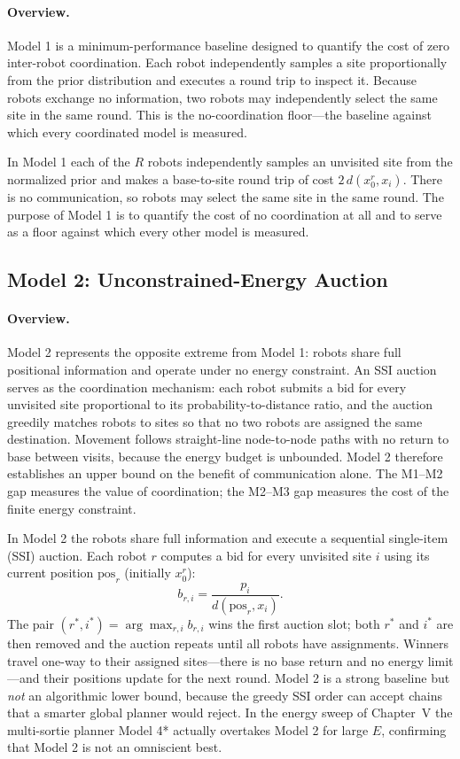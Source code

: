 \begin{doublespacing}
\paragraph{Overview.} Model 1 is a minimum-performance baseline designed
to quantify the cost of zero inter-robot coordination.
Each robot independently samples a site proportionally from the
prior distribution and executes a round trip to inspect it.
Because robots exchange no information, two robots may independently
select the same site in the same round.
This is the no-coordination floor---the baseline against which every
coordinated model is measured.

In Model 1 each of the $R$ robots independently samples an unvisited
site from the normalized prior and makes a base-to-site round trip of
cost $2\,d(x_0^r, x_i)$. There is no communication, so robots may
select the same site in the same round. The purpose of Model 1 is to
quantify the cost of no coordination at all and to serve as a floor
against which every other model is measured.

\subsection{Model 2: Unconstrained-Energy Auction}

\paragraph{Overview.} Model 2 represents the opposite extreme from
Model 1: robots share full positional information and operate under
no energy constraint.
An SSI auction serves as the coordination mechanism: each robot
submits a bid for every unvisited site proportional to its
probability-to-distance ratio, and the auction greedily matches
robots to sites so that no two robots are assigned the same
destination.
Movement follows straight-line node-to-node paths with no return
to base between visits, because the energy budget is unbounded.
Model 2 therefore establishes an upper bound on the benefit of
communication alone.
The M1--M2 gap measures the value of coordination; the M2--M3 gap
measures the cost of the finite energy constraint.

In Model 2 the robots share full information and execute a sequential
single-item (SSI) auction. Each robot $r$ computes a bid for every
unvisited site $i$ using its current position $\mathrm{pos}_r$
(initially $x_0^r$):
\[
  b_{r,i} = \frac{p_i}{d(\mathrm{pos}_r, x_i)}.
\]
The pair $(r^*, i^*) = \arg\max_{r,i} b_{r,i}$ wins the first auction
slot; both $r^*$ and $i^*$ are then removed and the auction repeats
until all robots have assignments. Winners travel one-way to their
assigned sites---there is no base return and no energy limit---and
their positions update for the next round. Model 2 is a strong
baseline but \emph{not} an algorithmic lower bound, because the greedy
SSI order can accept chains that a smarter global planner would
reject. In the energy sweep of Chapter~V the multi-sortie planner
Model 4* actually overtakes Model 2 for large $E$, confirming that
Model 2 is not an omniscient best.


\end{doublespacing}
